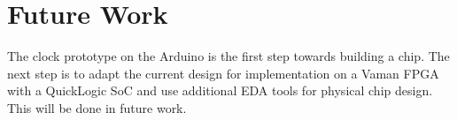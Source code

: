 \section{Future Work}
The clock prototype on the Arduino is the first step towards building a chip.  The next step is to adapt the current design for implementation on a Vaman FPGA with a QuickLogic SoC and use additional EDA tools for physical chip design.  This will be done in future work.   
\iffalse
\begin{itemize}
\item Integration with wireless modules (Bluetooth/Wi-Fi) for remote time setting and synchronization.
\item Addition of alarms, timers, and countdown features with user-defined events.
\item Implementation of a real-time clock (RTC) module for improved accuracy and power efficiency.
\item Expansion to a multi-language or multi-format (12/24-hour) display interface.
\item Incorporation of IoT functionality for smart home or wearable applications.
\end{itemize}
\fi

